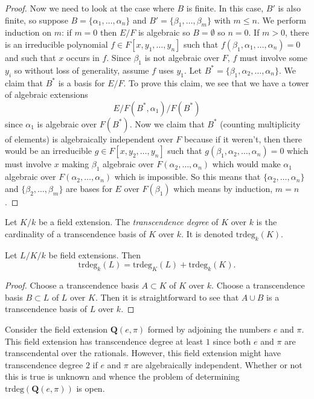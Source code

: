 \begin{proof}
\medskip\noindent
Now we need to look at the case where $B$ is finite.
In this case, $B'$ is also finite, so suppose
$B = \{\alpha_1, \ldots, \alpha_n\}$ and
$B' = \{\beta_1, \ldots, \beta_m\}$ with $m \leq n$.
We perform induction on $m$: if $m = 0$ then $E/F$ is algebraic so
$B = \emptyset$ so $n = 0$. If $m > 0$, there is an irreducible polynomial
$f \in F[x, y_1, \ldots, y_n]$ such that
$f(\beta_1, \alpha_1, \ldots, \alpha_n) = 0$ and such that $x$ occurs in $f$.
Since $\beta_1$ is not algebraic over $F$, $f$ must involve some $y_i$
so without loss of generality, assume $f$ uses $y_1$.
Let $B^* = \{\beta_1, \alpha_2, \ldots, \alpha_n\}$.
We claim that $B^*$ is a basis for $E/F$. To prove this claim, we see that
we have a tower of algebraic extensions
$$
E/ F(B^*, \alpha_1) / F(B^*)
$$
since $\alpha_1$ is algebraic over $F(B^*)$.
Now we claim that $B^*$ (counting multiplicity of elements) is
algebraically independent over $F$ because if it weren't, then there would be an
irreducible $g\in F[x, y_2, \ldots, y_n]$ such that
$g(\beta_1, \alpha_2, \ldots, \alpha_n) = 0$
which must involve $x$ making $\beta_1$
algebraic over $F(\alpha_2, \ldots, \alpha_n)$ which would make $\alpha_1$
algebraic over $F(\alpha_2, \ldots, \alpha_n)$ which is impossible.
So this means that $\{\alpha_2, \ldots, \alpha_n\}$ and
$\{\beta_2, \ldots, \beta_m\}$ are bases for $E$ over $F(\beta_1)$
which means by induction, $m = n$.
\end{proof}

\begin{definition}
\label{definition-transcendence-degree}
Let $K/k$ be a field extension.
The {\it transcendence degree} of $K$ over $k$ is
the cardinality of a transcendence basis of $K$ over $k$.
It is denoted $\text{trdeg}_k(K)$.
\end{definition}

\begin{lemma}
\label{lemma-transcendence-degree-tower}
Let $L/K/k$ be field extensions.
Then
$$
\text{trdeg}_k(L) =
\text{trdeg}_K(L) +
\text{trdeg}_k(K).
$$
\end{lemma}

\begin{proof}
Choose a transcendence basis $A \subset K$ of $K$ over $k$.
Choose a transcendence basis $B \subset L$ of $L$ over $K$.
Then it is straightforward to see that $A \cup B$ is a transcendence
basis of $L$ over $k$.
\end{proof}

\begin{example}
\label{example-pi-e-transcendental}
Consider the field extension $\mathbf{Q}(e, \pi)$ formed by
adjoining the numbers $e$ and $\pi$. This field extension has transcendence
degree at least $1$ since both $e$ and $\pi$ are transcendental over the
rationals. However, this field extension might have transcendence
degree $2$ if $e$ and $\pi$ are algebraically independent. Whether or
not this is true is unknown and whence the problem of determining
$\text{trdeg}(\mathbf{Q}(e, \pi))$ is open.
\end{example}

